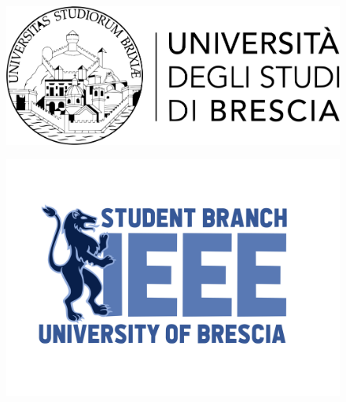 \begin{frame}[plain]
    \titlepage
    \begin{minipage}{0.5\textwidth}
        \begin{figure}
            \centering
            \includegraphics[width=1.0\textwidth]{src/images/unibs}
        \end{figure}
    \end{minipage}%
    \begin{minipage}{0.5\textwidth}
        \begin{figure}
            \centering
            \includegraphics[width=1.0\textwidth]{src/images/STB01019}
        \end{figure}
    \end{minipage}%
\end{frame}